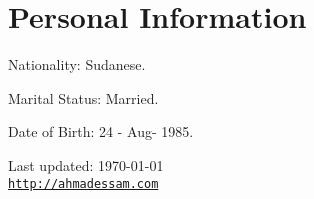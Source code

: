 \documentclass[letterpaper]{article}
\def\footerlink{http://ahmadessam.com}
\renewenvironment{itemize}{
  \begin{list}{}{
    \setlength{\leftmargin}{1.5em}
  }
}{
  \end{list}
}
\begin{document}

\section*{Personal Information}
\begin{itemize}
\item Nationality: {\small Sudanese.}
\item Marital Status: {\small Married.}
\item Date of Birth: {\small 24 - Aug- 1985.}
\end{itemize}

\bigskip

\begin{center}
  \begin{footnotesize}
    Last updated: \today \\
    \href{\footerlink}{\texttt{\footerlink}}
  \end{footnotesize}
\end{center}
\end{document}
